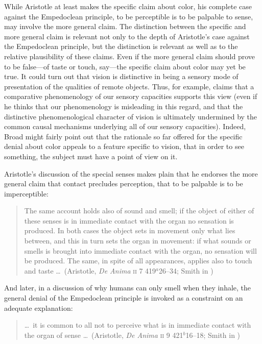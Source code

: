While Aristotle at least makes the specific claim about color, his complete case against the Empedoclean principle, to be perceptible is to be palpable to sense, may involve the more general claim. The distinction between the specific and more general claim is relevant not only to the depth of Aristotle's case against the Empedoclean principle, but the distinction is relevant as well as to the relative plausibility of these claims. Even if the more general claim should prove to be false---of taste or touch, say---the specific claim about color may yet be true. It could turn out that vision is distinctive in being a sensory mode of presentation of the qualities of remote objects. Thus, for example, \citet[]{Broad:1952kx} claims that a comparative phenomenology of our sensory capacities supports this view (even if he thinks that our phenomenology is misleading in this regard, and that the distinctive phenomenological character of vision is ultimately undermined by the common causal mechanisms underlying all of our sensory capacities). Indeed, Broad might fairly point out that the rationale so far offered for the specific denial about color appeals to a feature specific to vision, that in order to see something, the subject must have a point of view on it.

Aristotle's discussion of the special senses makes plain that he endorses the more general claim that contact precludes perception, that to be palpable is to be imperceptible:
\begin{quote}
	The same account holds also of sound and smell; if the object of either of these senses is in immediate contact with the organ no sensation is produced. In both cases the object sets in movement only what lies between, and this in turn sets the organ in movement: if what sounds or smells is brought into immediate contact with the organ, no sensation will be produced. The same, in spite of all appearances, applies also to touch and taste \ldots\ (Aristotle, \emph{De Anima} \textsc{ii} 7 419\( ^{a} \)26--34; Smith in \citealt[34]{Barnes:1984uq})
\end{quote}
And later, in a discussion of why humans can only smell when they inhale, the general denial of the Empedoclean principle is invoked as a constraint on an adequate explanation:
\begin{quote}
	\ldots\ it is common to all not to perceive what is in immediate contact with the organ of sense \ldots\ (Aristotle, \emph{De Anima} \textsc{ii} 9 421\( ^{b} \)16--18; Smith in \citealt[38]{Barnes:1984uq})
\end{quote}

